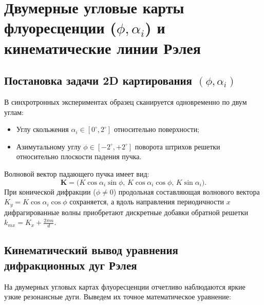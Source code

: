 \documentclass[a4paper,11pt]{article}
\begin{document}
\newpage
\section{Двумерные угловые карты флуоресценции (\texorpdfstring{$\phi, \alpha_i$}{phi, alpha}) и кинематические линии Рэлея}

\subsection{Постановка задачи 2D картирования \texorpdfstring{$(\phi, \alpha_i)$}{(phi, alpha_i)}}

В синхротронных экспериментах образец сканируется одновременно по двум углам:
\begin{itemize}
    \item Углу скольжения $\alpha_i \in [0^\circ, 2^\circ]$ относительно поверхности;
    \item Азимутальному углу $\phi \in [-2^\circ, +2^\circ]$ поворота штрихов решетки относительно плоскости падения пучка.
\end{itemize}

Волновой вектор падающего пучка имеет вид:
\begin{equation}
    \mathbf{K} = \big(K \cos\alpha_i \sin\phi, \, K \cos\alpha_i \cos\phi, \, K \sin\alpha_i\big).
\end{equation}
При конической дифракции ($\phi \ne 0$) продольная составляющая волнового вектора $K_y = K \cos\alpha_i \cos\phi$ сохраняется, а вдоль направления периодичности $x$ дифрагированные волны приобретают дискретные добавки обратной решетки $k_{mx} = K_x + \frac{2\pi m}{d}$.

\subsection{Кинематический вывод уравнения дифракционных дуг Рэлея}

На двумерных угловых картах флуоресценции отчетливо наблюдаются яркие узкие резонансные дуги. Выведем их точное математическое уравнение:
\end{document}
